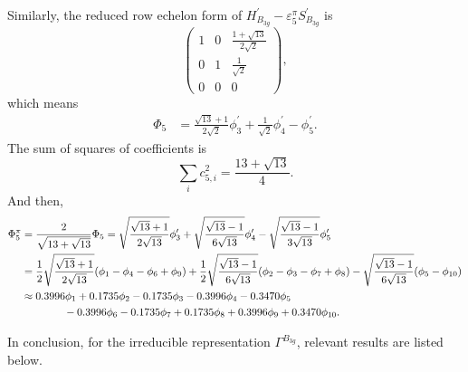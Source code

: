 \documentclass[a4paper]{book}
\newcommand{\Hp}{H^\prime}
\newcommand{\Sp}{S^\prime}
\begin{document}
\begin{solution}
\begin{enumerate}[label=(\alph*)]
		Similarly, the reduced row echelon form of $\Hp_{B_{3g}}-\varepsilon^\pi_5 \Sp_{B_{3g}}$ is
		\begin{equation*}
			\begin{pmatrix}
				1	& 0	&	\frac{1+\sqrt{13}}{2\sqrt{2}}	\\	0	&	1	&	\frac{1}{\sqrt{2}}	\\	0	&	0	&	0
			\end{pmatrix},
		\end{equation*}		
		which means
		\begin{align*}
			\Phi_5 &= \frac{\sqrt{13}+1}{2\sqrt{2}}\phi^\prime_3 + \frac{1}{\sqrt{2}} \phi^\prime_4 - \phi^\prime_5.
		\end{align*}
		The sum of squares of coefficients is
		\begin{equation*}
			\sum_{i} c^2_{5,i} = \frac{13+\sqrt{13}}{4}.
		\end{equation*}
		And then,
		\begin{align}
			\Phi^\pi_5 &= \frac{2}{\sqrt{13+\sqrt{13}}} \Phi_5 = \sqrt{\frac{\sqrt{13}+1}{2\sqrt{13}}} \phi^\prime_3 + \sqrt{\frac{\sqrt{13}-1}{6\sqrt{13}}} \phi^\prime_4	- \sqrt{\frac{\sqrt{13}-1}{3\sqrt{13}}} \phi^\prime_5\notag \\
			&= \frac{1}{2}\sqrt{\frac{\sqrt{13}+1}{2\sqrt{13}}}(\phi_1 - \phi_4 - \phi_6 + \phi_9) + \frac{1}{2}\sqrt{\frac{\sqrt{13}-1}{6\sqrt{13}}} (\phi_2 - \phi_3 - \phi_7 + \phi_8) \notag - \sqrt{\frac{\sqrt{13}-1}{6\sqrt{13}}} (\phi_5 -\phi_{10})  \\
			&\approx 0.3996 \phi_1 + 0.1735 \phi_2 - 0.1735 \phi_3 -0.3996 \phi_4 - 0.3470 \phi_5 \notag \\
			&\hspace*{4em} - 0.3996\phi_6 -0.1735 \phi_7 +0.1735 \phi_8 + 0.3996 \phi_9 + 0.3470 \phi_{10}.
		\end{align}

		In conclusion, for the irreducible representation $\Gamma^{B_{3g}}$, relevant results are listed below.
		

\end{enumerate}
\end{solution}
\end{document}
